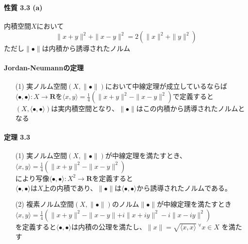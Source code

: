 \documentclass[12pt,a4paper]{article}
\begin{document}
  \paragraph{性質 3.3 (a)}
    内積空間$X$において \\
    \[ \parallel x + y \parallel^2 + \parallel x - y \parallel^2 = 2(\parallel x \parallel^2 + \parallel y \parallel^2) \]
    ただし$\parallel\bullet\parallel$は内積から誘導されたノルム

  \paragraph{Jordan-Neumannの定理}
    \begin{itemize}
      \item[(1)] 実ノルム空間$(X, \parallel\bullet\parallel)$において中線定理が成立しているならば \\
        $\langle\bullet,\bullet\rangle: X \rightarrow \mathbf{R}$を$\langle x, y \rangle = \frac14 ( \parallel x + y \parallel^2 - \parallel x - y \parallel^2 )$で定義すると \\
        $(X, \langle\bullet,\bullet\rangle)$は実内積空間となり、$\parallel\bullet\parallel$はこの内積から誘導されたノルムとなる
    \end{itemize}

  \paragraph{定理 3.3}
    \begin{itemize}
      \item[(1)] 実ノルム空間$(X, \parallel\bullet\parallel)$が中線定理を満たすとき、\\
        $\langle x, y \rangle = \frac 14 ( \parallel x + y \parallel^2 - \parallel x - y \parallel^2 )$ \\
        により写像$\langle \bullet,\bullet \rangle : X^2 \rightarrow \mathbf{R}$を定義すると \\
        $\langle\bullet,\bullet\rangle$は$X$上の内積であり、$\parallel\bullet\parallel$は$\langle\bullet,\bullet\rangle$から誘導されたノルムである。
      \item[(2)] 複素ノルム空間$(X, \parallel\bullet\parallel)$のノルム$\parallel\bullet\parallel$が中線定理を満たすとき \\
        $\langle x, y \rangle = \frac 14 (\parallel x + y \parallel^2 - \parallel x - y \parallel + i \parallel x + i y \parallel^2 - i \parallel x - i y \parallel^2)$ \\
        を定義すると$\langle \bullet,\bullet\rangle$は内積の公理を満たし、$\parallel x \parallel = \sqrt{\langle x, x \rangle} \ {}^\forall x \in X$ を満たす
    \end{itemize}
  
\end{document}
